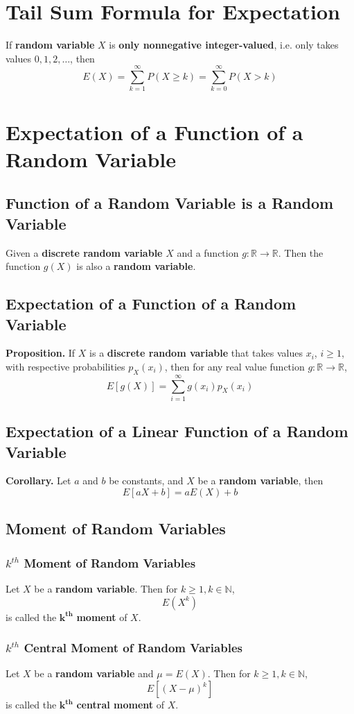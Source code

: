 \documentclass[../st2131_notes.tex]{subfiles}
\begin{document}
\section{Tail Sum Formula for Expectation}
If \textbf{random variable} \(X\) is \textbf{only nonnegative integer-valued}, i.e. only takes values \(0,1,2,\ldots\), then
\[E(X)=\sum_{k=1}^\infty P(X\geq k)=\sum_{k=0}^\infty P(X>k)\]

\section{Expectation of a Function of a Random Variable}
\subsection{Function of a Random Variable is a Random Variable}
Given a \textbf{discrete random variable} \(X\) and a function \(g:\mathbb{R}\to\mathbb{R}\). Then the function \(g(X)\) is also a \textbf{random variable}.

\subsection{Expectation of a Function of a Random Variable}
\textbf{Proposition.} If \(X\) is a \textbf{discrete random variable} that takes values \(x_i\), \(i\geq1\), with respective probabilities \(p_X(x_i)\), then for any real value function \(g:\mathbb{R}\to\mathbb{R}\),
\[E[g(X)]=\sum_{i=1}^\infty g(x_i)p_X(x_i)\]

\subsection{Expectation of a Linear Function of a Random Variable}
\textbf{Corollary.} Let \(a\) and \(b\) be constants, and \(X\) be a \textbf{random variable}, then
\[E[aX+b]=aE(X)+b\]

\subsection{Moment of Random Variables}
\subsubsection{$k^{th}$ Moment of Random Variables}
Let \(X\) be a \textbf{random variable}. Then for \(k\geq1,k\in\mathbb{N}\),
\[E(X^k)\]
is called the \(\pmb{k^{th}}\) \textbf{moment} of \(X\).

\subsubsection{$k^{th}$ Central Moment of Random Variables}
Let \(X\) be a \textbf{random variable} and \(\mu=E(X)\). Then for \(k\geq1,k\in\mathbb{N}\),
\[E[(X-\mu)^k]\]
is called the \(\pmb{k^{th}}\) \textbf{central moment} of \(X\).
\end{document}
